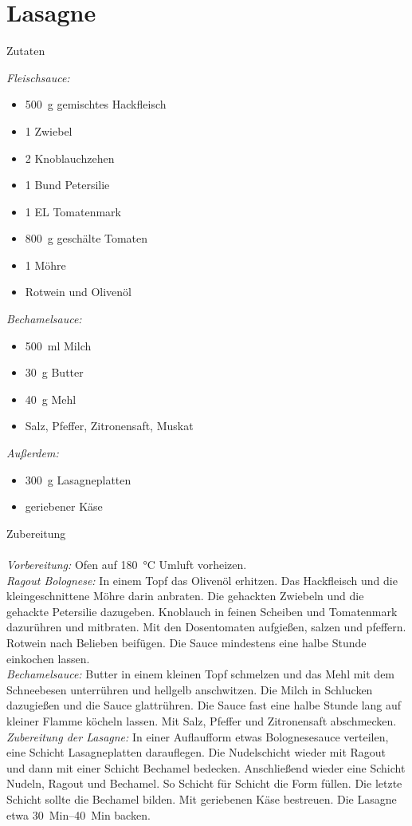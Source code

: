 \section*{Lasagne}
\ihead{}\ohead{}
\cfoot{}
{\Large Zutaten}
\begin{multicols}{2}
\textit{Fleischsauce:}
\begin{itemize}
    \item \SI{500}{g} gemischtes Hackfleisch
    \item \num{1} Zwiebel
    \item \num{2} Knoblauchzehen
    \item \num{1} Bund Petersilie
    \item \num{1} EL Tomatenmark
    \item \SI{800}{g} geschälte Tomaten 
    \item \num{1} Möhre
    \item Rotwein und Olivenöl
\end{itemize}
\textit{Bechamelsauce:}
\begin{itemize}
    \item \SI{500}{ml} Milch
    \item \SI{30}{g} Butter
    \item \SI{40}{g} Mehl
    \item Salz, Pfeffer, Zitronensaft, Muskat
\end{itemize}
\textit{Außerdem:}
\begin{itemize}
    \item \SI{300}{g} Lasagneplatten
    \item geriebener Käse
\end{itemize}
\end{multicols}
\noindent
{\Large Zubereitung}\\
\\
\textit{Vorbereitung:} Ofen auf \SI{180}{\celsius} Umluft vorheizen.\\
\textit{Ragout Bolognese:} In einem Topf das Olivenöl erhitzen.
Das Hackfleisch und die kleingeschnittene Möhre darin anbraten.
Die gehackten Zwiebeln und die gehackte Petersilie dazugeben.
Knoblauch in feinen Scheiben und Tomatenmark dazurühren und mitbraten.
Mit den Dosentomaten aufgießen, salzen und pfeffern. 
Rotwein nach Belieben beifügen.
Die Sauce mindestens eine halbe Stunde einkochen lassen. \\
\textit{Bechamelsauce:} Butter in einem kleinen Topf schmelzen und das Mehl mit dem Schneebesen unterrühren und hellgelb anschwitzen.
Die Milch in Schlucken dazugießen und die Sauce glattrühren. 
Die Sauce fast eine halbe Stunde lang auf kleiner Flamme köcheln lassen. 
Mit Salz, Pfeffer und Zitronensaft abschmecken. \\
\textit{Zubereitung der Lasagne:} In einer Auflaufform etwas Bolognesesauce verteilen, eine Schicht Lasagneplatten darauflegen.
Die Nudelschicht wieder mit Ragout und dann mit einer Schicht Bechamel bedecken. 
Anschließend wieder eine Schicht Nudeln, Ragout und Bechamel. 
So Schicht für Schicht die Form füllen. 
Die letzte Schicht sollte die Bechamel bilden. 
Mit geriebenen Käse bestreuen.
Die Lasagne etwa \SIrange{30}{40}{Min} backen. 
